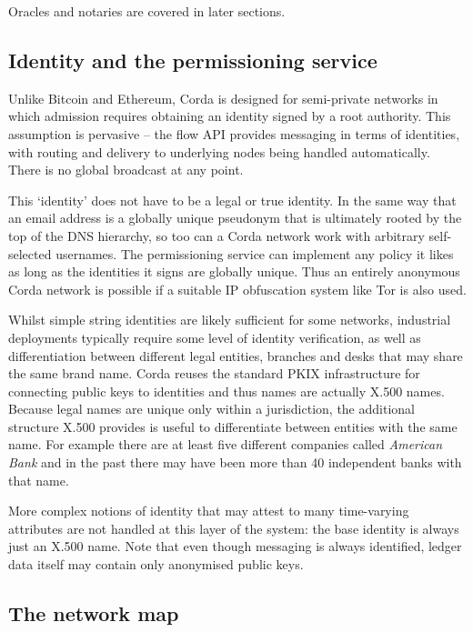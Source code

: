 \documentclass{article}
\begin{document}
Oracles and notaries are covered in later sections.

\subsection{Identity and the permissioning service}

Unlike Bitcoin and Ethereum, Corda is designed for semi-private networks in which admission requires obtaining an
identity signed by a root authority. This assumption is pervasive -- the flow API provides messaging in terms of
identities, with routing and delivery to underlying nodes being handled automatically. There is no global broadcast
at any point.

This `identity' does not have to be a legal or true identity. In the same way that an email address is a globally
unique pseudonym that is ultimately rooted by the top of the DNS hierarchy, so too can a Corda network work with
arbitrary self-selected usernames. The permissioning service can implement any policy it likes as long as the
identities it signs are globally unique. Thus an entirely anonymous Corda network is possible if a suitable IP
obfuscation system like Tor\cite{Dingledine:2004:TSO:1251375.1251396} is also used.

Whilst simple string identities are likely sufficient for some networks, industrial deployments typically require
some level of identity verification, as well as differentiation between different legal entities, branches and
desks that may share the same brand name. Corda reuses the standard PKIX infrastructure for connecting public keys
to identities and thus names are actually X.500 names. Because legal names are unique only within a jurisdiction,
the additional structure X.500 provides is useful  to differentiate between entities with the same name. For
example there are at least five different companies called \emph{American Bank} and in the past there may have been
more than 40 independent banks with that name.

More complex notions of identity that may attest to many time-varying attributes are not handled at this layer of
the system: the base identity is always just an X.500 name. Note that even though messaging is always identified,
ledger data itself may contain only anonymised public keys.

\subsection{The network map}
\end{document}
